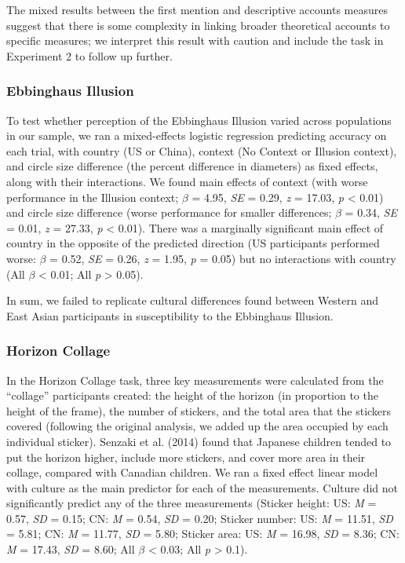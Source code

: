 \documentclass[
  man,floatsintext]{apa6}
\begin{document}
The mixed results between the first mention and descriptive accounts measures suggest that there is some complexity in linking broader theoretical accounts to specific measures; we interpret this result with caution and include the task in Experiment 2 to follow up further.

\hypertarget{ebbinghaus-illusion-1}{%
\subsubsection{Ebbinghaus Illusion}\label{ebbinghaus-illusion-1}}

To test whether perception of the Ebbinghaus Illusion varied across populations in our sample, we ran a mixed-effects logistic regression predicting accuracy on each trial, with country (US or China), context (No Context or Illusion context), and circle size difference (the percent difference in diameters) as fixed effects, along with their interactions. We found main effects of context (with worse performance in the Illusion context; \(\beta\) = 4.95, \emph{SE} = 0.29, \emph{z} = 17.03, \emph{p} \textless{} 0.01) and circle size difference (worse performance for smaller differences; \(\beta\) = 0.34, \emph{SE} = 0.01, \emph{z} = 27.33, \emph{p} \textless{} 0.01). There was a marginally significant main effect of country in the opposite of the predicted direction (US participants performed worse: \(\beta\) = 0.52, \emph{SE} = 0.26, \emph{z} = 1.95, \emph{p} = 0.05) but no interactions with country (All \(\beta\) \textless{} 0.01; All \emph{p} \textgreater{} 0.05).

In sum, we failed to replicate cultural differences found between Western and East Asian participants in susceptibility to the Ebbinghaus Illusion.

\hypertarget{horizon-collage-1}{%
\subsubsection{Horizon Collage}\label{horizon-collage-1}}

In the Horizon Collage task, three key measurements were calculated from the ``collage'' participants created: the height of the horizon (in proportion to the height of the frame), the number of stickers, and the total area that the stickers covered (following the original analysis, we added up the area occupied by each individual sticker). Senzaki et al. (2014) found that Japanese children tended to put the horizon higher, include more stickers, and cover more area in their collage, compared with Canadian children. We ran a fixed effect linear model with culture as the main predictor for each of the measurements. Culture did not significantly predict any of the three measurements (Sticker height: US: \emph{M} = 0.57, \emph{SD} = 0.15; CN: \emph{M} = 0.54, \emph{SD} = 0.20; Sticker number: US: \emph{M} = 11.51, \emph{SD} = 5.81; CN: \emph{M} = 11.77, \emph{SD} = 5.80; Sticker area: US: \emph{M} = 16.98, \emph{SD} = 8.36; CN: \emph{M} = 17.43, \emph{SD} = 8.60; All \(\beta\) \textless{} 0.03; All \emph{p} \textgreater{} 0.1).
\end{document}

